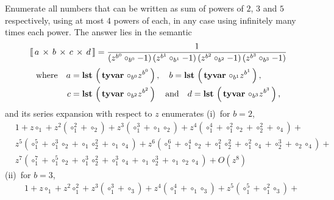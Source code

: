 \begin{example}
Enumerate all numbers that can be written as sum of powers of $2$, $3$ and $5$
respectively, using at most $4$ powers of each, in any case using infinitely
many times each power.  The answer lies in the semantic
\begin{displaymath}
\left\llbracket\,a\,\times\,b\,\times\,c\,\times\,d\,\right\rrbracket = \frac{1}{\left(z^{b^{0}} \circ_{b^{0}} - 1\right) \left(z^{b^{1}} \circ_{b^{1}} - 1\right) \left(z^{b^{2}} \circ_{b^{2}} - 1\right) \left(z^{b^{3}} \circ_{b^{3}} - 1\right)}
\end{displaymath}
\begin{displaymath}
\begin{split}
\text{where}\quad
    a &= \textbf{lst}\,\left(\,\textbf{tyvar}\,\,{\circ}_{b^{0}} z^{b^{0}}\,\right),\quad
        b = \textbf{lst}\,\left(\,\textbf{tyvar}\,\,{\circ}_{b^{1}} z^{b^{1}}\,\right),\\
    c &= \textbf{lst}\,\left(\,\textbf{tyvar}\,\,{\circ}_{b^{2}} z^{b^{2}}\,\right)\quad\text{and}\quad
        d = \textbf{lst}\,\left(\,\textbf{tyvar}\,\,{\circ}_{b^{3}} z^{b^{3}}\,\right),
\end{split}
\end{displaymath}
and its series expansion with respect to $z$ enumerates (i)~for $b=2$,
\begin{displaymath}
\begin{split}
&1 + z \circ_{1} + z^{2} \left(\circ_{1}^{2} + \circ_{2}\right) + z^{3} \left(\circ_{1}^{3} + \circ_{1} \circ_{2}\right) + z^{4} \left(\circ_{1}^{4} + \circ_{1}^{2} \circ_{2} + \circ_{2}^{2} + \circ_{4}\right) + \\
&z^{5} \left(\circ_{1}^{5} + \circ_{1}^{3} \circ_{2} + \circ_{1} \circ_{2}^{2} + \circ_{1} \circ_{4}\right) + z^{6} \left(\circ_{1}^{6} + \circ_{1}^{4} \circ_{2} + \circ_{1}^{2} \circ_{2}^{2} + \circ_{1}^{2} \circ_{4} + \circ_{2}^{3} + \circ_{2} \circ_{4}\right) + \\
&z^{7} \left(\circ_{1}^{7} + \circ_{1}^{5} \circ_{2} + \circ_{1}^{3} \circ_{2}^{2} + \circ_{1}^{3} \circ_{4} + \circ_{1} \circ_{2}^{3} + \circ_{1} \circ_{2} \circ_{4}\right) + O\left(z^{8}\right)
\end{split}
\end{displaymath}
(ii)~for $b=3$,
\begin{displaymath}
\begin{split}
&1 + z {\circ}_{1} + z^{2} {\circ}_{1}^{2} + z^{3} \left({\circ}_{1}^{3} + {\circ}_{3}\right) + z^{4} \left({\circ}_{1}^{4} + {\circ}_{1} {\circ}_{3}\right) + z^{5} \left({\circ}_{1}^{5} + {\circ}_{1}^{2} {\circ}_{3}\right) +\\

\end{split}
\end{displaymath}
\end{example}
